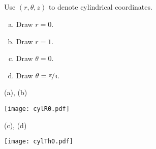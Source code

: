 


\subsection*{\Conceptual}

\begin{question}
Use $(r,\theta,z)$ to denote cylindrical coordinates.
\begin{enumerate}[(a)]
\item
Draw $r=0$.
\item
Draw $r=1$.
\item 
Draw $\theta=0$.
\item
Draw $\theta=\nicefrac{\pi}{4}$.
\end{enumerate}

\end{question}

%

\begin{answer}
(a), (b)
\begin{center}
   \texttt{[image: cylR0.pdf]}\qquad\qquad
\end{center}

(c), (d)
\begin{center}
   \texttt{[image: cylTh0.pdf]}\qquad\qquad
\end{center}

\end{answer}

